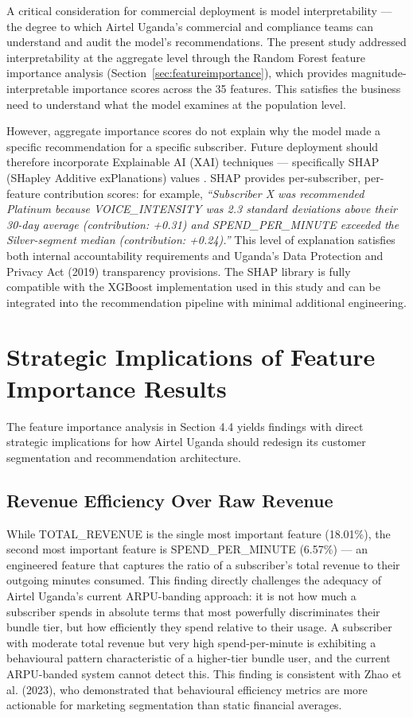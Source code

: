 A critical consideration for commercial deployment is model interpretability ---
the degree to which Airtel Uganda's commercial and compliance teams can understand
and audit the model's recommendations. The present study addressed interpretability
at the aggregate level through the Random Forest feature importance analysis
(Section~\ref{sec:featureimportance}), which provides magnitude-interpretable
importance scores across the 35 features. This satisfies the business need to
understand what the model examines at the population level.

However, aggregate importance scores do not explain why the model made a specific
recommendation for a specific subscriber. Future deployment should therefore
incorporate Explainable AI (XAI) techniques --- specifically SHAP (SHapley
Additive exPlanations) values \cite{ref_shap}. SHAP provides per-subscriber,
per-feature contribution scores: for example, \textit{``Subscriber X was recommended
Platinum because VOICE\_INTENSITY was 2.3 standard deviations above their 30-day
average (contribution: +0.31) and SPEND\_PER\_MINUTE exceeded the Silver-segment
median (contribution: +0.24).''} This level of explanation satisfies both internal
accountability requirements and Uganda's Data Protection and Privacy Act (2019)
\cite{ref47} transparency provisions. The SHAP library is fully compatible with
the XGBoost implementation used in this study and can be integrated into the
recommendation pipeline with minimal additional engineering.

\section{Strategic Implications of Feature Importance Results}

The feature importance analysis in Section 4.4 yields findings with direct strategic implications for how Airtel Uganda should redesign its customer segmentation and recommendation architecture.


\subsection{Revenue Efficiency Over Raw Revenue}

While TOTAL\_REVENUE is the single most important feature (18.01\%), the second most important feature is SPEND\_PER\_MINUTE (6.57\%) --- an engineered feature that captures the ratio of a subscriber's total revenue to their outgoing minutes consumed. This finding directly challenges the adequacy of Airtel Uganda's current ARPU-banding approach: it is not how much a subscriber spends in absolute terms that most powerfully discriminates their bundle tier, but how efficiently they spend relative to their usage. A subscriber with moderate total revenue but very high spend-per-minute is exhibiting a behavioural pattern characteristic of a higher-tier bundle user, and the current ARPU-banded system cannot detect this. This finding is consistent with Zhao et al. (2023), who demonstrated that behavioural efficiency metrics are more actionable for marketing segmentation than static financial averages.


